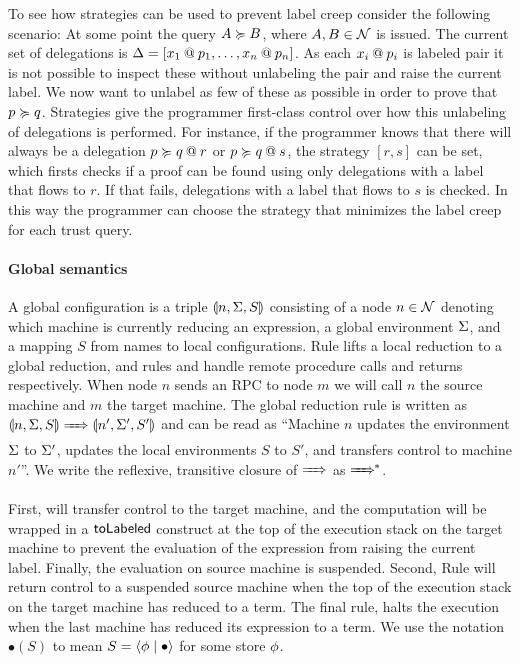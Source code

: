 To see how strategies can be used to prevent label creep consider the following scenario: At some point the query $A \actsfor B$, where $A, B \in \Nameset$ is issued. The current set of delegations is $\scope = \left[ \lb{p_1}{x_1}, \dots, \lb{p_n}{x_n} \right]$. As each $\lb{p_i}{x_i}$ is labeled pair it is not possible to inspect these without unlabeling the pair and raise the current label. We now want to unlabel as few of these as possible in order to prove that $p \actsfor q$. Strategies give the programmer first-class control over how this unlabeling of delegations is performed. For instance, if the programmer knows that there will always be a delegation $\lb{r}{p \actsfor q}$ or $\lb{s}{p \actsfor q}$, the strategy $\left[ r, s \right]$ can be set, which firsts checks if a proof can be found using only delegations with a label that flows to $r$. If that fails, delegations with a label that flows to $s$ is checked. In this way the programmer can choose the strategy that minimizes the label creep for each trust query.

\paragraph{Global semantics}
A global configuration is a triple $\gconfig{n}{\env}{S}$ consisting of a node $n \in \Nameset$ denoting which machine is currently reducing an expression, a global environment $\env$, and a mapping $S$ from names to local configurations. Rule  lifts a local reduction to a global reduction, and rules  and  handle remote procedure calls and returns respectively. When node $n$ sends an RPC to node $m$ we will call $n$ the source machine and $m$ the target machine. The global reduction rule is written as $\gconfig{n}{\env}{S} \gstepsto \gconfig{n'}{\env'}{S'}$ and can be read as ``Machine $n$ updates the environment $\env$ to $\env'$, updates the local environments $S$ to $S'$, and transfers control to machine $n'$''. We write the reflexive, transitive closure of $\gstepsto$ as $\gstepstos$.

First,  will transfer control to the target machine, and the computation will be wrapped in a $\tolabeledkw$ construct at the top of the execution stack on the target machine to prevent the evaluation of the expression from raising the current label. Finally, the evaluation on source machine is suspended. Second, Rule  will return control to a suspended source machine when the top of the execution stack on the target machine has reduced to a term. The final rule,  halts the execution when the last machine has reduced its expression to a term. We use the notation $\bullet(S)$ to mean $S = \config{\store}{\bullet}$ for some store $\store$.


